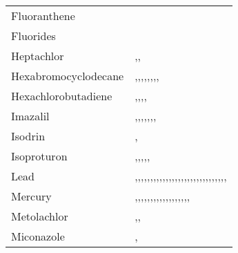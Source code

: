 \begin{tabular}{ll}
\cline{1-2}
Fluoranthene & \cite{Teijon_2010} \\
\cline{1-2}
Fluorides & \cite{Onyango_2006} \\
\cline{1-2}
Heptachlor & \cite{Ormad_2008},\cite{RAHMANI201882},\cite{Katsoyiannis_2004} \\
\cline{1-2}
Hexabromocyclodecane & \cite{Ruan_2019},\cite{Ichihara_2014},\cite{van_Leeuwen_2008},\cite{Schecter_2010},\cite{Gao_2019},\cite{Kim_2016},\cite{Kim_2018},\cite{Eljarrat_2014},\cite{Roosens_2009} \\
\cline{1-2}
Hexachlorobutadiene & \cite{Teijon_2010},\cite{Oonnittan_2009},\cite{Mailler_2013},\cite{Katsoyiannis_2004},\cite{Ormad_2008} \\
\cline{1-2}
Imazalil & \cite{Arias_2014},\cite{Jim_nez_2014},\cite{ISHIWATA_2002},\cite{Campo_2013},\cite{Blasco_2006},\cite{Matsumoto_1994},\cite{Kne_evi__2012},\cite{Kahle_2008} \\
\cline{1-2}
Isodrin & \cite{Ormad_2008},\cite{RAHMANI201882} \\
\cline{1-2}
Isoproturon & \cite{Teijon_2010},\cite{Mailler_2013},\cite{Stamatis_2010},\cite{RAHMANI201882},\cite{Gorito_2021},\cite{Ormad_2008} \\
\cline{1-2}
Lead & \cite{Lester_1979},\cite{da_Silva_Oliveira_2007},\cite{Dimitrova_1998},\cite{Yoshida_2015},\cite{Feng_2018},\cite{Teijon_2010},\cite{Marzougui_2018},\cite{Johnson_2008},\cite{Buzier_2006},\cite{Gupta_1998},\cite{Orescanin_2013},\cite{Busetti_2005},\cite{Goldstone_1990},\cite{Choubert_2011},\cite{Moriyama_1988},\cite{Drozdova_2018},\cite{Honarmandrad_2020},\cite{Brown_1973},\cite{Samarghandi_2007},\cite{Sterritt_1981},\cite{Hargreaves_2016},\cite{Karvelas_2003},\cite{Lester_1983},\cite{Chiu_2016},\cite{Mansourri_2016},\cite{Zhou_2018},\cite{Mal_2021},\cite{OLIVER_1974},\cite{Edokpayi_2015},\cite{Sudo_1973},\cite{Gardner_2013} \\
\cline{1-2}
Mercury & \cite{Lester_1979},\cite{Bodaly_1998},\cite{da_Silva_Oliveira_2007},\cite{Yoshida_2015},\cite{Balogh_1995},\cite{Feng_2018},\cite{Teijon_2010},\cite{Busetti_2005},\cite{Goldstone_1990},\cite{Moriyama_1988},\cite{Drozdova_2018},\cite{Sterritt_1981},\cite{Brown_1973},\cite{Hargreaves_2016},\cite{Balogh_2008},\cite{Chiu_2016},\cite{Zhou_2018},\cite{Giraldo_2020},\cite{OLIVER_1974} \\
\cline{1-2}
Metolachlor & \cite{Ormad_2008},\cite{RAHMANI201882},\cite{Collivignarelli_2004} \\
\cline{1-2}
Miconazole & \cite{Liu_2017},\cite{Juksu_2019} \\

\end{tabular}
